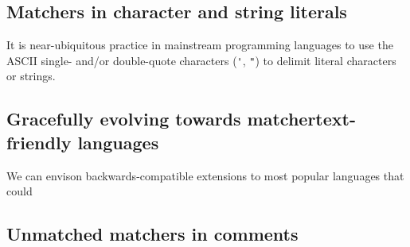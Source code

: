 \subsection{Matchers in character and string literals}

It is near-ubiquitous practice in mainstream programming languages 
to use the ASCII single- and/or double-quote characters (\verb|'|, \verb|"|)
to delimit literal characters or strings.

\subsection{Gracefully evolving towards matchertext-friendly languages}

We can envison backwards-compatible extensions to most popular languages
that could 


\subsection{Unmatched matchers in comments}



